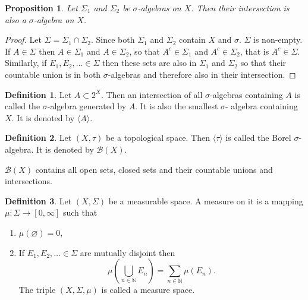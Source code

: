 \documentclass{article}
\theoremstyle{plain}
\numberwithin{thm}{section}
\theoremstyle{plain}
\newtheorem{prop}{Proposition}
\numberwithin{prop}{section}
\theoremstyle{definition}
\newtheorem{defn}{Definition}
\numberwithin{defn}{section}
\theoremstyle{remark}
\numberwithin{equation}{section}
\begin{document}
\begin{prop}\label{s1p3}
Let $\Sigma_1$ and $\Sigma_2$ be $\sigma$-algebras on $X$. Then their
intersection is also a $\sigma$-algebra on $X$.
\end{prop}
\begin{proof}
Let $\Sigma = \Sigma_1 \cap \Sigma_2$. Since both $\Sigma_1$ and 
$\Sigma_2$ contain $X$ and $\sigma$. $\Sigma$ is non-empty. If $A \in
\Sigma$ then $A \in \Sigma_1$ and $A \in \Sigma_2$, so that $A^c 
\in \Sigma_1$ and $A^c \in \Sigma_2$, that is $A^c \in \Sigma$. 
Similarly, if $E_1, E_2, \ldots \in \Sigma$ then these sets are also in 
$\Sigma_1$ and $\Sigma_2$ so that their countable union is in both
$\sigma$-algebras and therefore also in their intersection.
\end{proof}

\begin{defn}\label{s1d4}
Let $A \subset 2^X$. Then an intersection of all $\sigma$-algebras containing $A$
is called the $\sigma$-algebra generated by $A$. It is also the smallest $\sigma$-
algebra containing $X$. It is denoted by $\langle A \rangle$.
\end{defn}

\begin{defn}\label{s1d5}
Let $(X, \tau)$ be a topological space. Then $\langle\tau\rangle$ is called the
Borel $\sigma$-algebra. It is denoted by $\mathcal{B}(X)$.
\end{defn}

$\mathcal{B}(X)$ contains all open sets, closed sets and their countable unions
and intersections.

\begin{defn}\label{s1d6}
Let $(X, \Sigma)$ be a measurable space. A measure on it is a mapping
$\mu: \Sigma \rightarrow [0, \infty]$ such that
\begin{enumerate}
\item $\mu(\varnothing) = 0$,
\item If $E_1, E_2, \ldots \in \Sigma$ are mutually disjoint then
\[
\mu\left(\bigcup_{n \in \mathbb{N}}E_n\right) = \sum_{n \in \mathbb{N}}\mu(E_n).
\]
The triple $(X, \Sigma, \mu)$ is called a measure space.
\end{enumerate}
\end{defn}
\end{document}
